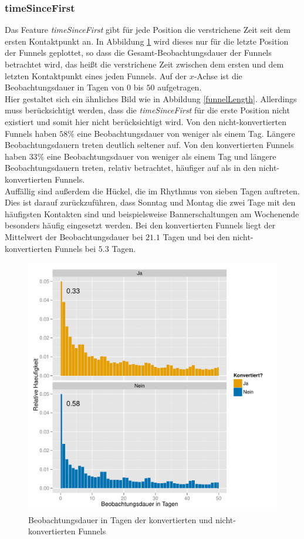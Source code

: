 \subsubsection*{timeSinceFirst}
Das Feature \textit{timeSinceFirst} gibt für jede Position die verstrichene Zeit seit dem ersten Kontaktpunkt an. In Abbildung \ref{timeSinceFirst} wird dieses nur für die letzte Position der Funnels geplottet, so dass die Gesamt-Beobachtungsdauer der Funnels betrachtet wird, das heißt die verstrichene Zeit zwischen dem ersten und dem letzten Kontaktpunkt eines jeden Funnels. Auf der $x$-Achse ist die Beobachtungsdauer in Tagen von $0$ bis $50$ aufgetragen.\\
Hier gestaltet sich ein ähnliches Bild wie in Abbildung \ref{funnelLength}. Allerdings muss berücksichtigt werden, dass die \textit{timeSinceFirst} für die erste Position nicht existiert und somit hier nicht berücksichtigt wird. Von den nicht-konvertierten Funnels haben $58 \%$ eine Beobachtungsdauer von weniger als einem Tag. Längere Beobachtungsdauern treten deutlich seltener auf. Von den konvertierten Funnels haben $33 \%$ eine Beobachtungsdauer von weniger als einem Tag und längere Beobachtungsdauern treten, relativ betrachtet, häufiger auf als in den nicht-konvertierten Funnels.\\
Auffällig sind außerdem die Hückel, die im Rhythmus von sieben Tagen auftreten. Dies ist darauf zurückzuführen, dass Sonntag und Montag die zwei Tage mit den häufigsten Kontakten sind und beispielsweise Bannerschaltungen am Wochenende besonders häufig eingesetzt werden. Bei den konvertierten Funnels liegt der Mittelwert der Beobachtungsdauer bei $21.1$ Tagen und bei den nicht-konvertierten Funnels bei $5.3$ Tagen. 
\begin{figure}[H]
    \centering
    \includegraphics[scale=0.5]{timeSinceFirst_Last.pdf}
    \caption[Beobachtungsdauer in Tagen]{Beobachtungsdauer in Tagen der konvertierten und nicht-konvertierten Funnels}
    \label{timeSinceFirst}
\end{figure}

